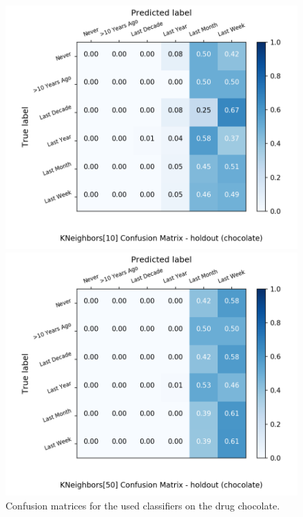 \begin{figure}[H]
\begin{minipage}[b]{0.32\textwidth}
		\includegraphics[width=1.1\textwidth]{Plots/drugs/chocolate_KNeighbors_10_balance_False_holdout.png}
  \end{minipage}
	\begin{minipage}[b]{0.32\textwidth}
		\includegraphics[width=1.1\textwidth]{Plots/drugs/chocolate_KNeighbors_50_balance_False_holdout.png}
  \end{minipage}
	\caption{Confusion matrices for the used classifiers on the drug chocolate.}
\end{figure}

